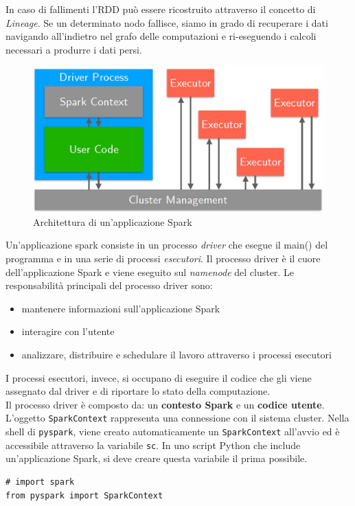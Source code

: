 \documentclass{article}
\begin{document}
\begin{appendices}
In caso di fallimenti l'RDD può essere ricostruito attraverso il concetto di \textit{Lineage}. Se un determinato nodo fallisce, siamo in grado di recuperare i dati navigando all'indietro nel grafo delle computazioni e ri-eseguendo i calcoli necessari a produrre i dati persi.\\
\begin{figure}[H]
    \centering
    \includegraphics[scale=0.3]{img/spark.jpg}
    \caption{Architettura di un'applicazione Spark}
\end{figure}\noindent
Un'applicazione spark consiste in un processo \textit{driver} che esegue il main() del programma e in una serie di processi \textit{esecutori}. Il processo driver è il cuore dell'applicazione Spark e viene eseguito sul \textit{namenode} del cluster. Le responsabilità principali del processo driver sono:
\begin{itemize}
    \item mantenere informazioni sull'applicazione Spark
    \item interagire con l'utente
    \item analizzare, distribuire e schedulare il lavoro attraverso i processi esecutori
\end{itemize}
I processi esecutori, invece, si occupano di eseguire il codice che gli viene assegnato dal driver e di riportare lo stato della computazione. \\ 
Il processo driver è composto da: un \textbf{contesto Spark} e un \textbf{codice utente}. L'oggetto \texttt{SparkContext} rappresenta una connessione con il sistema cluster. Nella shell di \texttt{pyspark}, viene creato automaticamente un \texttt{SparkContext} all'avvio ed è accessibile attraverso la variabile \texttt{sc}. In uno script Python che include un'applicazione Spark, si deve creare questa variabile il prima possibile.
\begin{lstlisting}
# import spark
from pyspark import SparkContext


\end{lstlisting}
\end{appendices}
\end{document}
